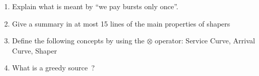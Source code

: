 \begin{problem}

\begin{enumerate}

    \item Explain what is meant by ``we pay bursts only once''.

        \item Give a summary in at most 15 lines of the main properties of
        shapers

        \item  Define the following concepts by using the $\otimes $ operator:
        Service Curve, Arrival Curve, Shaper

        \item  What is a greedy source~?
\end{enumerate}
\end{problem}
